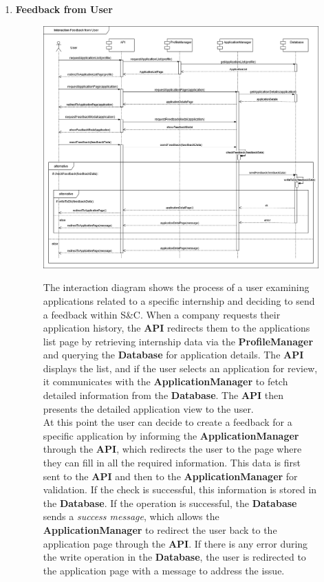 \begin{enumerate}
    \newpage
    \item \textbf{Feedback from User}
    \begin{figure}[h!]
            \centering  \includegraphics[width=1\textwidth]{DD/Images/Interactions/INT16_ FeedbackFromUser.drawio.png}
            \label{fig:ComponentViewDiagram}
            \caption*{
                The interaction diagram shows the process of a user examining applications related to a specific internship and deciding to send a feedback within S\&C. When a company requests their application history, the \textbf{API} redirects them to the applications list page by retrieving internship data via the \textbf{ProfileManager} and querying the \textbf{Database} for application details. The \textbf{API} displays the list, and if the user selects an application for review, it communicates with the \textbf{ApplicationManager} to fetch detailed information from the \textbf{Database}. The \textbf{API} then presents the detailed application view to the user.
                \\At this point the user can decide to create a feedback for a specific application by informing the \textbf{ApplicationManager} through the \textbf{API}, which redirects the user to the page where they can fill in all the required information. This data is first sent to the \textbf{API} and then to the \textbf{ApplicationManager} for validation. If the check is successful, this information is stored in the \textbf{Database}. 
                If the operation is successful, the \textbf{Database} sends a \textit{success message}, which allows the \textbf{ApplicationManager} to redirect the user back to the application page through the \textbf{API}. 
                If there is any error during the write operation in the \textbf{Database}, the user is redirected to the application page with a message to address the issue.
            }
    \end{figure}
    

\end{enumerate}
